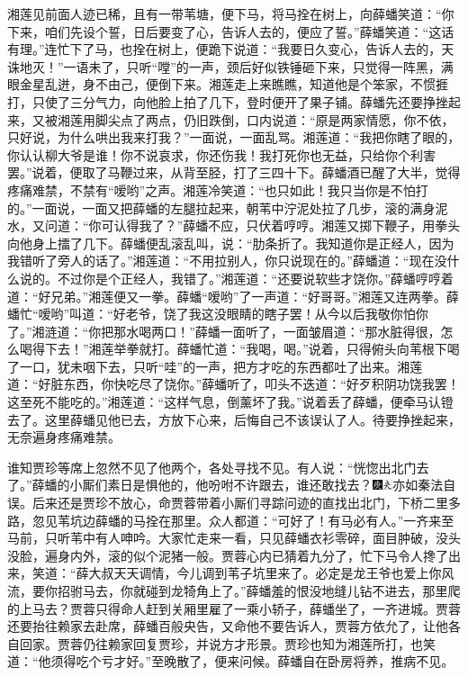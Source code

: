 湘莲见前面人迹已稀，且有一带苇塘，便下马，将马拴在树上，向薛蟠笑道：“你下来，咱们先设个誓，日后要变了心，告诉人去的，便应了誓。”薛蟠笑道：“这话有理。”连忙下了马，也拴在树上，便跪下说道：“我要日久变心，告诉人去的，天诛地灭！”一语未了，只听“嘡”的一声，颈后好似铁锤砸下来，只觉得一阵黑，满眼金星乱迸，身不由己，便倒下来。湘莲走上来瞧瞧，知道他是个笨家，不惯捱打，只使了三分气力，向他脸上拍了几下，登时便开了果子铺。薛蟠先还要挣挫起来，又被湘莲用脚尖点了两点，仍旧跌倒，口内说道：“原是两家情愿，你不依，只好说，为什么哄出我来打我？”一面说，一面乱骂。湘莲道：“我把你瞎了眼的，你认认柳大爷是谁！你不说哀求，你还伤我！我打死你也无益，只给你个利害罢。”说着，便取了马鞭过来，从背至胫，打了三四十下。薛蟠酒已醒了大半，觉得疼痛难禁，不禁有“嗳哟”之声。湘莲冷笑道：“也只如此！我只当你是不怕打的。”一面说，一面又把薛蟠的左腿拉起来，朝苇中泞泥处拉了几步，滚的满身泥水，又问道：“你可认得我了？”薛蟠不应，只伏着哼哼。湘莲又掷下鞭子，用拳头向他身上擂了几下。薛蟠便乱滚乱叫，说：“肋条折了。我知道你是正经人，因为我错听了旁人的话了。”湘莲道：“不用拉别人，你只说现在的。”薛蟠道：“现在没什么说的。不过你是个正经人，我错了。”湘莲道：“还要说软些才饶你。”薛蟠哼哼着道：“好兄弟。”湘莲便又一拳。薛蟠“嗳哟”了一声道：“好哥哥。”湘莲又连两拳。薛蟠忙“嗳哟”叫道：“好老爷，饶了我这没眼睛的瞎子罢！从今以后我敬你怕你了。”湘涟道：“你把那水喝两口！”薛蟠一面听了，一面皱眉道：“那水脏得很，怎么喝得下去！”湘莲举拳就打。薛蟠忙道：“我喝，喝。”说着，只得俯头向苇根下喝了一口，犹未咽下去，只听“哇”的一声，把方才吃的东西都吐了出来。湘莲道：“好脏东西，你快吃尽了饶你。”薛蟠听了，叩头不迭道：“好歹积阴功饶我罢！这至死不能吃的。”湘莲道：“这样气息，倒薰坏了我。”说着丢了薛蟠，便牵马认镫去了。这里薛蟠见他已去，方放下心来，后悔自己不该误认了人。待要挣挫起来，无奈遍身疼痛难禁。

谁知贾珍等席上忽然不见了他两个，各处寻找不见。有人说：“恍惚出北门去了。”薛蟠的小厮们素日是惧他的，他吩咐不许跟去，谁还敢找去？{\includegraphics[width=3mm]{../Images/00004}\includegraphics[width=3mm]{../Images/00012}\footnotesize \kaishu 亦如秦法自误。}后来还是贾珍不放心，命贾蓉带着小厮们寻踪问迹的直找出北门，下桥二里多路，忽见苇坑边薛蟠的马拴在那里。众人都道：“可好了！有马必有人。”一齐来至马前，只听苇中有人呻吟。大家忙走来一看，只见薛蟠衣衫零碎，面目肿破，没头没脸，遍身内外，滚的似个泥猪一般。贾蓉心内已猜着九分了，忙下马令人搀了出来，笑道：“薛大叔天天调情，今儿调到苇子坑里来了。必定是龙王爷也爱上你风流，要你招驸马去，你就碰到龙犄角上了。”薛蟠羞的恨没地缝儿钻不进去，那里爬的上马去？贾蓉只得命人赶到关厢里雇了一乘小轿子，薛蟠坐了，一齐进城。贾蓉还要抬往赖家去赴席，薛蟠百般央告，又命他不要告诉人，贾蓉方依允了，让他各自回家。贾蓉仍往赖家回复贾珍，并说方才形景。贾珍也知为湘莲所打，也笑道：“他须得吃个亏才好。”至晚散了，便来问候。薛蟠自在卧房将养，推病不见。

